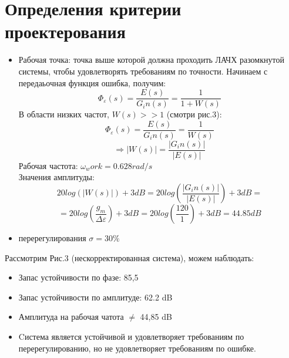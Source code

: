 \documentclass[a4paper,12pt]{article}
\begin{document}
\section{Определения критерии проектерования}
\begin{itemize}
    \item Рабочая точка: точка выше которой должна проходить ЛАЧХ разомкнутой системы, чтобы удовлетворять требованиям по точности. Начинаем с передаьочная функция ошибка, получим:
    $$\Phi_\varepsilon(s)=\frac{E(s)}{G_in(s)}=\frac{1}{1+W(s)}$$
    В области низких частот, $W(s)>>1$ (смотри рис.3):
    $$\Phi_\varepsilon(s)=\frac{E(s)}{G_in(s)}=\frac{1}{W(s)}$$
    $$\Rightarrow |W(s)|=\frac{|G_in(s)|}{|E(s)|}$$
    Рабочая частота: $\omega_work=0.628 rad/s$\\
    Значения амплитуды:
    $$20log(|W(s)|)+3dB=20log(\frac{|G_in(s)|}{|E(s)|})+3dB=$$
    $$=20log(\frac{g_m}{\Delta \varepsilon})+3dB=20log(\frac{120}{1})+3dB=44.85dB$$
    \item перерегулирования $\sigma = 30\%$\\
\end{itemize}
Рассмотрим Рис.3 (нескорректированная система), можем наблюдать:
\begin{itemize}
    \item Запас устойчивости по фазе: 85,5\degree
    \item Запас устойчивости по амплитуде: 62.2 dB
    \item Амплитуда на рабочая чатота $\ne$ 44,85 dB
    \item Cистема является устойчивой и удовлетворяет требованиям по перерегулированию, но не удовлетворяет требованиям по ошибке. 
\end{itemize}
\newpage
\end{document}

